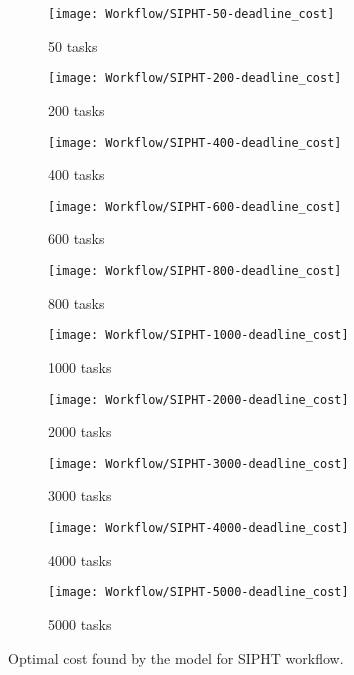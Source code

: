 {     \begin{figure}[tb] 
       \centering       
       \begin{subfigure}[b]{0.45\textwidth}
         \texttt{[image: Workflow/SIPHT-50-deadline\_cost]}
         \caption{50 tasks}
       \end{subfigure}
       \begin{subfigure}[b]{0.45\textwidth}
         \texttt{[image: Workflow/SIPHT-200-deadline\_cost]}
         \caption{200 tasks}
       \end{subfigure}
       \begin{subfigure}[b]{0.45\textwidth}
         \texttt{[image: Workflow/SIPHT-400-deadline\_cost]}
         \caption{400 tasks}
       \end{subfigure}
       \begin{subfigure}[b]{0.45\textwidth}
         \texttt{[image: Workflow/SIPHT-600-deadline\_cost]}
         \caption{600 tasks}
       \end{subfigure}
       \begin{subfigure}[b]{0.45\textwidth}
         \texttt{[image: Workflow/SIPHT-800-deadline\_cost]}
         \caption{800 tasks}
       \end{subfigure}
       \begin{subfigure}[b]{0.45\textwidth}
         \texttt{[image: Workflow/SIPHT-1000-deadline\_cost]}
         \caption{1000 tasks}
       \end{subfigure}
       \begin{subfigure}[b]{0.45\textwidth}
         \texttt{[image: Workflow/SIPHT-2000-deadline\_cost]}
         \caption{2000 tasks}
       \end{subfigure}
       \begin{subfigure}[b]{0.45\textwidth}
         \texttt{[image: Workflow/SIPHT-3000-deadline\_cost]}
         \caption{3000 tasks}
       \end{subfigure}
       \begin{subfigure}[b]{0.45\textwidth}
         \texttt{[image: Workflow/SIPHT-4000-deadline\_cost]}
         \caption{4000 tasks}
       \end{subfigure}
       \begin{subfigure}[b]{0.45\textwidth}
         \texttt{[image: Workflow/SIPHT-5000-deadline\_cost]}
         \caption{5000 tasks}
       \end{subfigure}
       \caption{Optimal cost found by the model for SIPHT workflow.}
       \label{fig:workflow:sipht}
     \end{figure}
 
}
